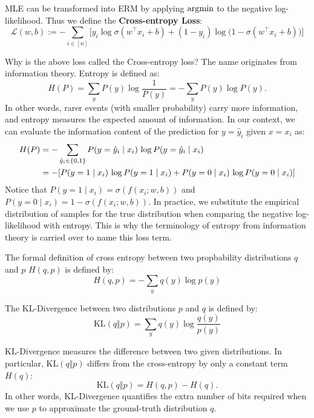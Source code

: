 \documentclass[../main]{subfiles}
\begin{document}
MLE can be transformed into ERM by applying $\mathop{\mathrm{argmin}}$ to the negative log-likelihood. 
Thus we define the \textbf{Cross-entropy Loss}:
\begin{equation}
    \mathcal{L}(w,b) 
    := - \sum_{i \in [n]} \Big[ 
      y_i \log \sigma(w^\top x_i + b) 
      + (1-y_i) \log \big(1 - \sigma(w^\top x_i + b)\big) 
    \Big]
\end{equation}
\begin{note}
  Why is the above loss called the {Cross-entropy loss}? 
  The name originates from information theory. 
  Entropy is defined as:
  \begin{equation}
      H(P) = \sum_y P(y)\log\frac{1}{P(y)} 
           = -\sum_y P(y)\log P(y).
  \end{equation}
  In other words, rarer events (with smaller probability) carry more information, 
  and entropy measures the expected amount of information. In our context, we can evaluate the information content of the prediction 
  for $y = \hat y_i$ given $x = x_i$ as:
  \begin{align}
      H(P) &= - \sum_{\hat y_i \in \{0,1\}} 
      P(y=\hat y_i \mid x_i)\,\log P(y=\hat y_i \mid x_i)\notag\\
      &=-[P(y=1\mid x_i)\,\log P(y=1\mid x_i)+P(y=0 \mid x_i)\,\log P(y=0 \mid x_i)]
  \end{align}
  Notice that $P(y=1 \mid x_i) = \sigma(f(x_i; w,b))$ and $P(y=0 \mid x_i) = 1 - \sigma(f(x_i; w,b))$. In practice, we substitute the empirical distribution of samples for the true distribution when comparing the negative log-likelihood with entropy. This is why the terminology of entropy from information theory is carried over to name this loss term.
\end{note}
\begin{note}
  The formal definition of cross entropy between two propbability distributions $q$ and $p$ $H(q,p)$ is defined by:
  \begin{equation}
      H(q,p)=-\sum_y q(y)\log p(y)
  \end{equation}
\end{note}
\begin{definition}[KL-Divergence]
  The KL-Divergence between two distributions $p$ and $q$ is defined by:
    \begin{equation}
        \mathrm{KL}(q\Vert p)=\sum_y q(y)\log\frac{q(y)}{p(y)}
    \end{equation}
\end{definition}
KL-Divergence measures the difference between two given distributions. 
In particular, $\mathrm{KL}(q \Vert p)$ differs from the cross-entropy by only a constant term $H(q)$:
\begin{equation}
  \mathrm{KL}(q \Vert p) = H(q, p) - H(q).
\end{equation}
In other words, KL-Divergence quantifies the extra number of bits required when we use $p$ to approximate the ground-truth distribution $q$.
\end{document}
